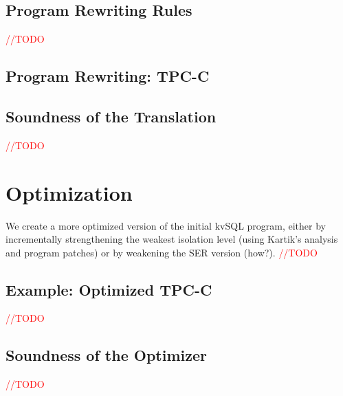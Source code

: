 \documentclass[12pt,letter]{article}
\begin{document}
\vspace{10mm}
\subsection{Program Rewriting Rules}
\textcolor{red}{//TODO}

\subsection{Program Rewriting: TPC-C}


\subsection{Soundness of the Translation}
\textcolor{red}{//TODO}


\section{Optimization}
We create a more optimized version of the initial kvSQL program, either by
incrementally strengthening the weakest isolation level
(using Kartik's analysis and program patches) or by weakening the SER version
(how?).
\textcolor{red}{//TODO}


\subsection{Example: Optimized TPC-C}
\textcolor{red}{//TODO}

\subsection{Soundness of the Optimizer}
\textcolor{red}{//TODO}





\end{document}
